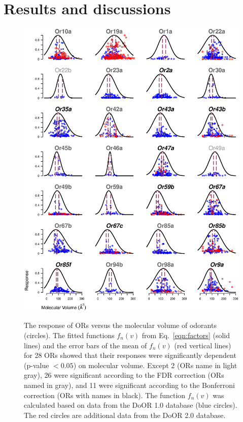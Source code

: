 \documentclass[fleqn,11pt]{wlscirep}
\newcommand{\numberofreceptors}{ 28 }
\newcommand{\bonferroni}{ 11 }
\newcommand{\fdr}{ 26 }
\newcommand{\nocorrection}{ 2 }
\begin{document}
\section*{Results and discussions}
\begin{figure}
	\centering
		\includegraphics[width= \textwidth]{vol-res-}
		\label{fig:vol-res:all}		
	\caption{The response of ORs versus the molecular volume of odorants (circles).  
			The fitted functions $f_n(v)$ from Eq.~\ref{eqn:factors} (solid lines) 
			and the error bars of the mean of $f_n(v)$ (red vertical lines) 
			for \numberofreceptors ORs showed that their responses were significantly dependent (p-value $<0.05$) on molecular volume. 
			Except \nocorrection (ORs name in light gray), \fdr were significant according to the FDR correction (ORs named in gray), and
			\bonferroni were significant according to the Bonferroni correction (ORs with names in black).
			The function $f_n(v)$ was calculated based on data from the DoOR 1.0 database (blue circles). 
			The red circles are additional data from the DoOR 2.0 database. 
		}
	\label{fig:vol-res}
\end{figure}
\end{document}
